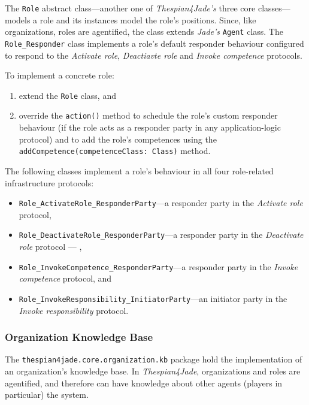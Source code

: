 The \texttt{Role} abstract class---another one of \textit{Thespian4Jade's} three core classes---models a role and its instances model the role's positions.
Since, like organizations, roles are agentified, the class extends \textit{Jade's} \texttt{Agent} class.
The \texttt{Role\_Responder} class implements a role's default responder behaviour configured to respond to the \textit{Activate role}, \textit{Deactiavte role} and \textit{Invoke competence} protocols.

To implement a concrete role:
\begin{enumerate}
	\item extend the \texttt{Role} class, and
	\item override the \texttt{action()} method to schedule the role's custom responder behaviour (if the role acts as a responder party in any application-logic protocol) and to add the role's competences using the \texttt{addCompetence(competenceClass: Class)} method.	
\end{enumerate}

The following classes implement a role's behaviour in all four role-related infrastructure protocols:
\begin{itemize}
	\item \texttt{Role\_ActivateRole\_ResponderParty}---a responder party in the \textit{Activate role} protocol,
	\item \texttt{Role\_DeactivateRole\_ResponderParty}---a responder party in the \textit{Deactivate role} protocol --- ,
	\item \texttt{Role\_InvokeCompetence\_ResponderParty}---a responder party in the \textit{Invoke competence} protocol, and
	\item \texttt{Role\_InvokeResponsibility\_InitiatorParty}---an initiator party in the \textit{Invoke responsibility} protocol.
\end{itemize}

\subsubsection{Organization Knowledge Base}

The \texttt{thespian4jade.core.organization.kb} package hold the implementation of an organization's knowledge base.
In \textit{Thespian4Jade}, organizations and roles are agentified, and therefore can have knowledge about other agents (players in particular) the system.

